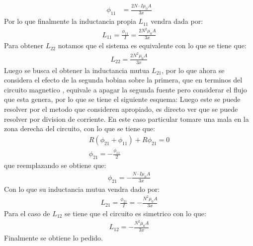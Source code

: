 \documentclass[
  11pt,
  letterpaper,
   addpoints,
   answers
  ]{exam}
\begin{document}
\begin{questions}
\begin{solution}
\begin{align}
            \phi_{11} &= \frac{2N \cdot I \mu_{0}A}{3x}
        \end{align}
        Por lo que finalmente la inductancia propia $L_{11}$ vendra dada por:
        \begin{align}
            L_{11} = \frac{\phi_{11}}{I} = \frac{2N^{2} \mu_{0}A}{3x}
        \end{align}
        Para obtener $L_{22}$ notamos que el sistema es equivalente con lo que se tiene que:
        \begin{align}
            L_{22} = \frac{2N^{2} \mu_{0}A}{3x}
        \end{align}
        Luego se busca el obtener la inductancia mutua $L_{21}$, por lo que ahora se considera el efecto de la segunda bobina sobre la primera, que en terminos del circuito magnetico , equivale a apagar la segunda fuente pero considerar el flujo que esta genera, por lo que se tiene el siguiente esquema:
        Luego este se puede resolver por el metodo  que consideren apropiado, es directo ver que se puede resolver por division de corriente. En este caso particular tomare una mala en la zona derecha del circuito, con lo que se tiene que:
        \begin{align}
            R(\phi_{21} + \phi_{11})+ R\phi_{21}= 0\\
            \phi_{21} = -\frac{\phi_{11}}{2}
        \end{align}
        que reemplazando se obtiene que:
        \begin{align}
            \phi_{21} = -\frac{N \cdot I \mu_{0}A}{3x}
        \end{align}
        Con lo que su inductancia mutua vendra dado por:
        \begin{align}
            L_{21} = \frac{\phi_{21}}{I} = -\frac{N^{2} \mu_{0}A}{3x}
        \end{align}
        Para el caso de $L_{12}$ se tiene que el circuito es simetrico con lo que:
        \begin{align}
            L_{12} = -\frac{N^{2} \mu_{0}A}{3x}
        \end{align}
        Finalmente se obtiene lo pedido.

\end{solution}
\end{questions}
\end{document}

